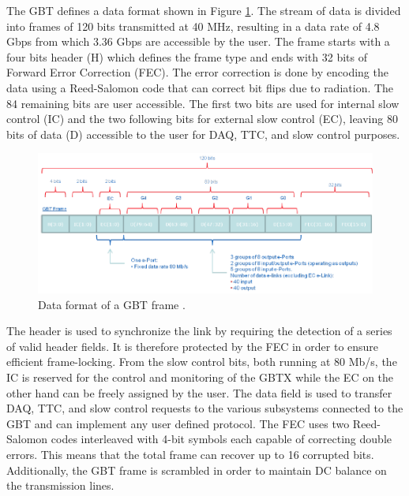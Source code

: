       The GBT defines a data format shown in Figure \ref{fig:II-2-gbt-frame}. The stream of data is divided into frames of 120 bits transmitted at 40 MHz, resulting in a data rate of 4.8 Gbps from which 3.36 Gbps are accessible by the user. The frame starts with a four bits header (H) which defines the frame type and ends with 32 bits of Forward Error Correction (FEC). The error correction is done by encoding the data using a Reed-Salomon code that can correct bit flips due to radiation. The 84 remaining bits are user accessible. The first two bits are used for internal slow control (IC) and the two following bits for external slow control (EC), leaving 80 bits of data (D) accessible to the user for DAQ, TTC, and slow control purposes. \\

      \begin{figure}[t!]
        \centering
        \includegraphics[width=\textwidth]{img/II-2-daq/gbt-frame.pdf}
        \caption{Data format of a GBT frame \cite{Moreira:1235836}.}
        \label{fig:II-2-gbt-frame}
      \end{figure}

      The header is used to synchronize the link by requiring the detection of a series of valid header fields. It is therefore protected by the FEC in order to ensure efficient frame-locking. From the slow control bits, both running at 80 Mb/s, the IC is reserved for the control and monitoring of the GBTX while the EC on the other hand can be freely assigned by the user. The data field is used to transfer DAQ, TTC, and slow control requests to the various subsystems connected to the GBT and can implement any user defined protocol. The FEC uses two Reed-Salomon codes interleaved with 4-bit symbols each capable of correcting double errors. This means that the total frame can recover up to 16 corrupted bits. Additionally, the GBT frame is scrambled in order to maintain DC balance on the transmission lines. \\

